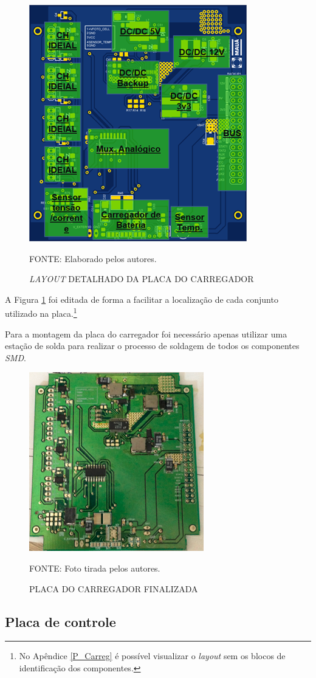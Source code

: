 \documentclass[
	12pt,				%
	openright,			%
	oneside,			%
	a4paper,			%
	english,			%
	french,				%
	spanish,			%
	brazil,				%
	oldfontcommands
	]{abntex2}
\begin{document}
	\begin{figure}[th]
		\caption{\textit{LAYOUT} DETALHADO DA PLACA DO CARREGADOR}
		\label{Fig_layout_carg}
		\centering
		\includegraphics[width=0.37\linewidth]{./figs/layout_carg}
			
		\begin{small}
			FONTE: Elaborado pelos autores.
		\end{small}
	\end{figure}
	
	A Figura \ref{Fig_layout_carg} foi editada de forma a facilitar a localização de cada conjunto utilizado na placa.\footnote{No Apêndice \ref{P_Carreg} é possível visualizar o \textit{layout} sem os blocos de identificação dos componentes.}
	
	Para a montagem da placa do carregador foi necessário apenas utilizar uma estação de solda para realizar o processo de soldagem de todos os componentes \textit{SMD}.
	
	\begin{figure}[th]
		\caption{PLACA DO CARREGADOR FINALIZADA}
		\label{Fig_placa_carg}
		\centering
		\includegraphics[width=0.37\linewidth]{./figs/placa_carreg}
			
		\begin{small}
			FONTE: Foto tirada pelos autores.
		\end{small}
	\end{figure}
	\pagebreak
	
\subsection[Placa de controle]{Placa de controle}
\end{document}
